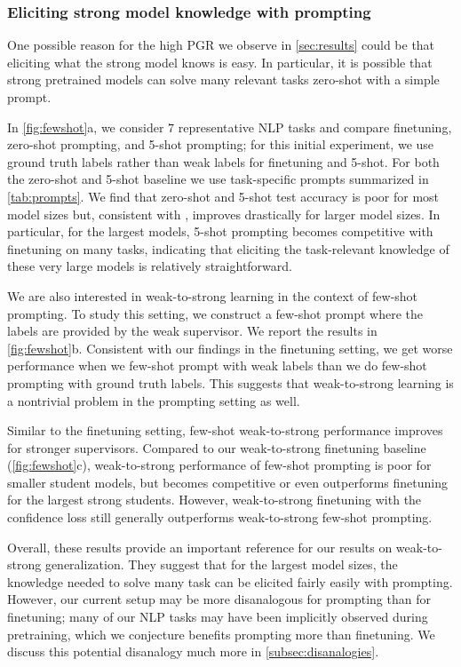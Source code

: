 \subsubsection{Eliciting strong model knowledge with prompting}
\label{subsec:prompting}

One possible reason for the high PGR we observe in \ref{sec:results} could be that eliciting what the strong model knows is easy. In particular, it is possible that strong pretrained models can solve many relevant tasks zero-shot with a simple prompt. 

In \ref{fig:fewshot}a, we consider $7$ representative NLP tasks and compare finetuning, zero-shot prompting, and 5-shot prompting; for this initial experiment, we use ground truth labels rather than weak labels for finetuning and 5-shot. For both the zero-shot and 5-shot baseline we use task-specific prompts summarized in \ref{tab:prompts}.
We find that zero-shot and 5-shot test accuracy is poor for most model sizes but, consistent with \cite{brown2020language}, improves drastically for larger model sizes. In particular, for the largest models, 5-shot prompting becomes competitive with finetuning on many tasks, indicating that eliciting the task-relevant knowledge of these very large models is relatively straightforward.  

We are also interested in weak-to-strong learning in the context of few-shot prompting. To study this setting, we construct a few-shot prompt where the labels are provided by the weak supervisor. We report the results in \ref{fig:fewshot}b.
Consistent with our findings in the finetuning setting, we get worse performance when we few-shot prompt with weak labels than we do few-shot prompting with ground truth labels. This suggests that weak-to-strong learning is a nontrivial problem in the prompting setting as well.

Similar to the finetuning setting, few-shot weak-to-strong performance improves for stronger supervisors. Compared to our weak-to-strong finetuning baseline (\ref{fig:fewshot}c), weak-to-strong performance of few-shot prompting is poor for smaller student models, but becomes competitive or even outperforms finetuning for the largest strong students. However, weak-to-strong finetuning with the confidence loss still generally outperforms weak-to-strong few-shot prompting.

Overall, these results provide an important reference for our results on weak-to-strong generalization. They suggest that for the largest model sizes, the knowledge needed to solve many task can be elicited fairly easily with prompting. However, our current setup may be more disanalogous for prompting than for finetuning; many of our NLP tasks may have been implicitly observed during pretraining, which we conjecture benefits prompting more than finetuning. We discuss this potential disanalogy much more in \ref{subsec:disanalogies}.

